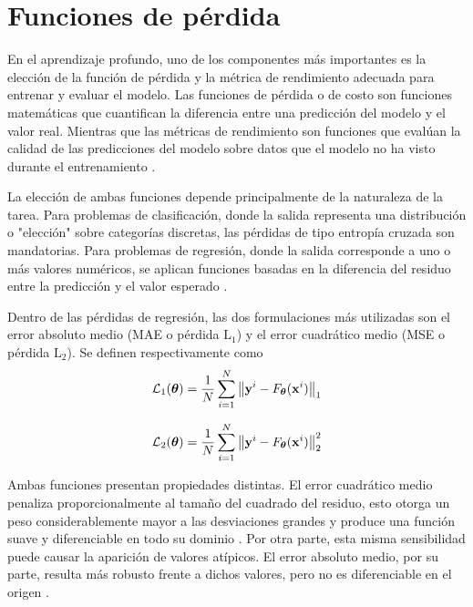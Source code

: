 
\section{Funciones de pérdida}
En el aprendizaje profundo, uno de los componentes más importantes es la elección de la función de pérdida y la métrica de rendimiento adecuada para entrenar y evaluar el modelo. 
Las funciones de pérdida o de costo son funciones matemáticas que cuantifican la diferencia entre una predicción del modelo y el valor real. Mientras que las métricas de rendimiento son funciones que evalúan la calidad de las predicciones del modelo
sobre datos que el modelo no ha visto durante el entrenamiento \cite{terven2025comprehensive}.

La elección de ambas funciones depende principalmente de la naturaleza de la tarea. Para problemas de clasificación, donde la salida representa una distribución o "elección" sobre categorías discretas, las pérdidas de tipo entropía cruzada son mandatorias. 
Para problemas de regresión, donde la salida corresponde a uno o más valores numéricos, se aplican funciones basadas en la diferencia del residuo entre la predicción y el valor esperado \cite{wang2021understanding,terven2025comprehensive}. 

Dentro de las pérdidas de regresión, las dos formulaciones más utilizadas son el error absoluto medio (MAE o pérdida $\mathrm{L}_1$) y el error cuadrático medio (MSE o pérdida $\mathrm{L}_2$). Se definen respectivamente como
\begin{equation}
    \mathcal{L}_{1}(\boldsymbol{\theta}) = \frac{1}{N}\sum_{i=1}^{N} \left\lVert \mathbf{y}^i - F_{\boldsymbol{\theta}}(\mathbf{x}^i) \right\rVert_{1}
    \label{eq:mae}
\end{equation}

\begin{equation}
    \mathcal{L}_{2}(\boldsymbol{\theta}) = \frac{1}{N}\sum_{i=1}^{N} \left\lVert \mathbf{y}^i - F_{\boldsymbol{\theta}}(\mathbf{x}^i) \right\rVert_{2}^{2}
    \label{eq:mse}
\end{equation}

Ambas funciones presentan propiedades distintas. El error cuadrático medio penaliza proporcionalmente al tamaño del cuadrado del residuo, esto otorga un peso considerablemente mayor a las desviaciones grandes y produce una función suave y diferenciable 
en todo su dominio \cite{janocha2017loss}. Por otra parte, esta misma sensibilidad puede causar la aparición de valores atípicos. El error absoluto medio, por su parte, resulta más robusto frente a dichos valores, pero no es diferenciable en el origen \cite{terven2025comprehensive}.


